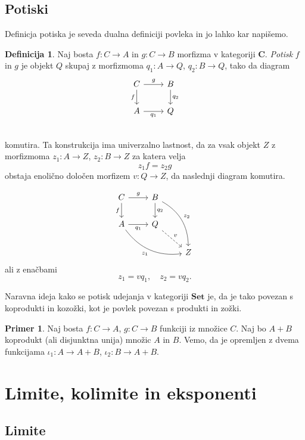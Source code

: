 \documentclass[12pt,a4paper]{book}
\theoremstyle{definition}
\newtheorem{definicija}{Definicija}[chapter]
\theoremstyle{plain}
\theoremstyle{definition}
\newtheorem{primer}{Primer}[section]
\theoremstyle{remark}
\newcommand{\cat}[1]{\textbf{#1}}
\begin{document}
\subsection{Potiski}

Definicja potiska je seveda dualna definiciji povleka in jo lahko kar napišemo.

\begin{definicija}
Naj bosta $f: C \to A$ in $g : C \to B$ morfizma v kategoriji $\cat{C}$. \emph{Potisk} $f$ in $g$ je objekt $Q$ skupaj z morfizmoma $q_1 : A \to Q$, $q_2 : B \to Q$, tako da diagram
$$\begin{tikzcd}
C \ar[r, "g"] \ar[d, "f"'] & B \ar[d, "q_2"] \\
A \ar[r, "q_1"'] & Q \\
\end{tikzcd}$$
komutira. Ta konstrukcija ima univerzalno lastnost, da za vsak objekt $Z$ z morfizmoma $z_1 : A \to Z$, $z_2 : B \to Z$ za katera velja $$z_1f = z_2g$$
obstaja enolično določen morfizem $v : Q \to Z$, da naslednji diagram komutira.

$$\begin{tikzcd}
C \ar[r, "g"] \ar[d, "f"'] & B \ar[d, "q_2"] \ar[ddr, bend left, "z_2"] & \\
A \ar[r, "q_1"'] \ar[drr, bend right, "z_1"'] & Q \ar[dr, dashed, "v"] & \\
& & Z 
\end{tikzcd}$$
ali z enačbami $$z_1 = v q_1, \quad z_2 = v q_2.$$
\end{definicija}

Naravna ideja kako se potisk udejanja v kategoriji $\cat{Set}$ je, da je tako povezan s koprodukti in kozožki, kot je povlek povezan s produkti in zožki.

\begin{primer}
Naj bosta $f : C \to A$, $g: C \to B$ funkciji iz množice $C$. Naj bo $A + B$ koprodukt (ali disjunktna unija) množic $A$ in $B$. Vemo, da je opremljen z dvema funkcijama $\iota_1 : A \to A + B$, $\iota_2 : B \to A+B$.
\end{primer}

\section{Limite, kolimite in eksponenti}


\subsection{Limite}
\end{document}
